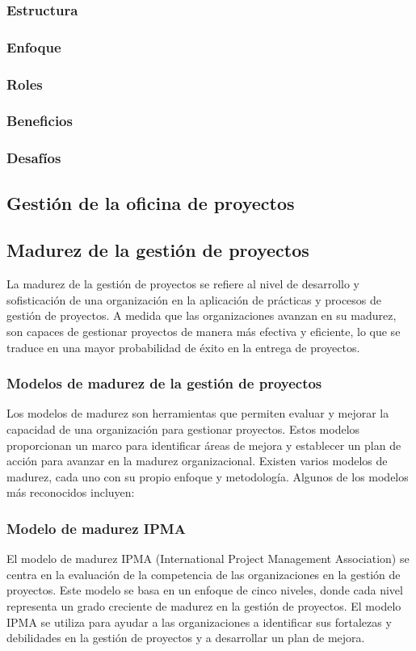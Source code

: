 \subsubsection{Estructura}
\subsubsection{Enfoque}
\subsubsection{Roles}
\subsubsection{Beneficios}
\subsubsection{Desafíos}

\subsection{Gestión de la oficina de proyectos}

\subsection{Madurez de la gestión de proyectos}
La madurez de la gestión de proyectos se refiere al nivel de desarrollo y sofisticación de una organización en la aplicación de prácticas y procesos de gestión de proyectos. A medida que las organizaciones avanzan en su madurez, son capaces de gestionar proyectos de manera más efectiva y eficiente, lo que se traduce en una mayor probabilidad de éxito en la entrega de proyectos.
\subsubsection{Modelos de madurez de la gestión de proyectos}
Los modelos de madurez son herramientas que permiten evaluar y mejorar la capacidad de una organización para gestionar proyectos. Estos modelos proporcionan un marco para identificar áreas de mejora y establecer un plan de acción para avanzar en la madurez organizacional. Existen varios modelos de madurez, cada uno con su propio enfoque y metodología. Algunos de los modelos más reconocidos incluyen:
\subsubsection{Modelo de madurez IPMA}
El modelo de madurez IPMA (International Project Management Association) se centra en la evaluación de la competencia de las organizaciones en la gestión de proyectos. Este modelo se basa en un enfoque de cinco niveles, donde cada nivel representa un grado creciente de madurez en la gestión de proyectos. El modelo IPMA se utiliza para ayudar a las organizaciones a identificar sus fortalezas y debilidades en la gestión de proyectos y a desarrollar un plan de mejora.
